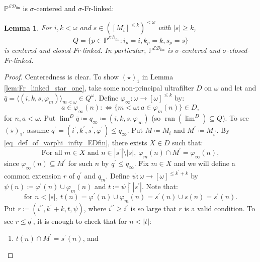 \documentclass[a4paper,12pt]{amsart}
\newtheorem{lem}[thm]{Lemma}
\theoremstyle{definition}
\numberwithin{thm}{section}
\numberwithin{equation}{section}
\newcommand{\on}{\mathpunct{\upharpoonright}}
\DeclareMathOperator{\ran}{ran}
\newcommand{\edfin}{\mathcal{ED}_\mathrm{fin}}
\newcommand{\posetEDfin}{\mathbb{P}^{\edfin}}
\begin{document}
    $\posetEDfin$ is $\sigma$-centered and $\sigma$-Fr-linked:
	
    \begin{lem}
		\label{lem:pEDfin_has_Fr-limits}
        For $i,k<\omega$ and $s\in([M_i]^{\leq k})^{<\omega}$ with $|s|\geq k$,
		\[
        Q=\{p\in\posetEDfin:i_p=i, k_p=k, s_p=s\}
        \]
        is centered and closed-Fr-linked. In particular, $\posetEDfin$ is $\sigma$-centered and $\sigma$-closed-Fr-linked.
	\end{lem}
	\begin{proof}
        Centeredness is clear.
		To show $(\star)_1$ in Lemma \ref{lem:Fr_linked_star_one}, take some non-principal ultrafilter $D$ on $\omega$ and let and $\bar{q}=\langle(i,k,s,\varphi_m)\rangle_{m<\omega}\in Q^\omega$. 
		Define $\varphi_\infty\colon\omega\to[\omega]^{\leq k}$ by:
		\begin{equation}
			\label{eq_def_of_varphi_infty_EDfin}
			a\in\varphi_\infty(n):\Leftrightarrow\{m<\omega:a\in\varphi_m(n)\}\in D,
		\end{equation}
		for $n,a<\omega$. Put $\lim^D\bar{q}\coloneqq q_\infty\coloneqq(i,k,s,\varphi_\infty)$ (so $\ran(\lim^D)\subseteq Q$). To see $(\star)_1$, 
		assume $q^\prime=(i^\prime,k^\prime,s^\prime,\varphi^\prime)\leq q_\infty$.
		Put $M\coloneq M_i$ and $M^\prime\coloneq M_{i^\prime}$.
		By \eqref{eq_def_of_varphi_infty_EDfin}, there exists $X\in D$ such that:
		\begin{equation}
			\label{eq_X_EDfin}
			\text{For all }m\in X\text{ and }n\in|s^\prime|\setminus|s|, ~\varphi_m(n)\cap M^\prime=\varphi_\infty(n),
		\end{equation}
        since $\varphi_\infty(n)\subseteq M^\prime$ for such $n$ by $q^\prime\leq q_\infty$.
		Fix $m\in X$ and we will define a common extension $r$ of $q^\prime$ and $q_m$. 
        Define $\psi\colon\omega\to [\omega]^{\leq k^\prime+k}$ by $\psi(n)\coloneqq\varphi^\prime(n)\cup\varphi_m(n)$ and $t\coloneq\psi\on|s^\prime|$. Note that:
		\begin{equation}
			\label{eq_t_n_equal_s_prime_n_EDfin}
			\text{for }n<|s|,~t(n)=\varphi^\prime(n)\cup\varphi_m(n)=s^\prime(n)\cup s(n)=s^\prime(n).
		\end{equation}
        Put $r\coloneq(i^{\prime\prime},k^\prime+k,t,\psi)$, where $i^{\prime\prime}\geq i^\prime$ is so large that $r$ is a valid condition. 
		To see $r\leq q^\prime$, it is enough to check that for $n<|t|$:
		\begin{enumerate}
			\item\label{item_r_leq_q_prime_first_EDfin} $t(n)\cap M^\prime=s^\prime(n)$, and

\end{enumerate}
\end{proof}
\end{document}
